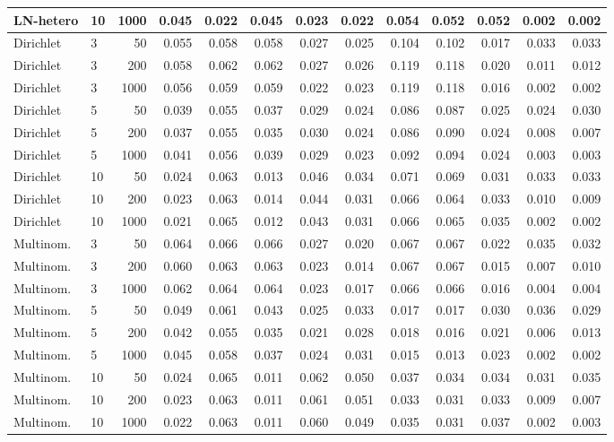 \begin{tabular}{llrrrrrrrrrrr}
LN-hetero & 10 & 1000 & 0.045 & 0.022 & 0.045 & 0.023 & 0.022 & 0.054 & 0.052 & 0.052 & 0.002 & 0.002 \\
\midrule
Dirichlet & 3 & 50 & 0.055 & 0.058 & 0.058 & 0.027 & 0.025 & 0.104 & 0.102 & 0.017 & 0.033 & 0.033 \\
Dirichlet & 3 & 200 & 0.058 & 0.062 & 0.062 & 0.027 & 0.026 & 0.119 & 0.118 & 0.020 & 0.011 & 0.012 \\
Dirichlet & 3 & 1000 & 0.056 & 0.059 & 0.059 & 0.022 & 0.023 & 0.119 & 0.118 & 0.016 & 0.002 & 0.002 \\
Dirichlet & 5 & 50 & 0.039 & 0.055 & 0.037 & 0.029 & 0.024 & 0.086 & 0.087 & 0.025 & 0.024 & 0.030 \\
Dirichlet & 5 & 200 & 0.037 & 0.055 & 0.035 & 0.030 & 0.024 & 0.086 & 0.090 & 0.024 & 0.008 & 0.007 \\
Dirichlet & 5 & 1000 & 0.041 & 0.056 & 0.039 & 0.029 & 0.023 & 0.092 & 0.094 & 0.024 & 0.003 & 0.003 \\
Dirichlet & 10 & 50 & 0.024 & 0.063 & 0.013 & 0.046 & 0.034 & 0.071 & 0.069 & 0.031 & 0.033 & 0.033 \\
Dirichlet & 10 & 200 & 0.023 & 0.063 & 0.014 & 0.044 & 0.031 & 0.066 & 0.064 & 0.033 & 0.010 & 0.009 \\
Dirichlet & 10 & 1000 & 0.021 & 0.065 & 0.012 & 0.043 & 0.031 & 0.066 & 0.065 & 0.035 & 0.002 & 0.002 \\
\midrule
Multinom. & 3 & 50 & 0.064 & 0.066 & 0.066 & 0.027 & 0.020 & 0.067 & 0.067 & 0.022 & 0.035 & 0.032 \\
Multinom. & 3 & 200 & 0.060 & 0.063 & 0.063 & 0.023 & 0.014 & 0.067 & 0.067 & 0.015 & 0.007 & 0.010 \\
Multinom. & 3 & 1000 & 0.062 & 0.064 & 0.064 & 0.023 & 0.017 & 0.066 & 0.066 & 0.016 & 0.004 & 0.004 \\
Multinom. & 5 & 50 & 0.049 & 0.061 & 0.043 & 0.025 & 0.033 & 0.017 & 0.017 & 0.030 & 0.036 & 0.029 \\
Multinom. & 5 & 200 & 0.042 & 0.055 & 0.035 & 0.021 & 0.028 & 0.018 & 0.016 & 0.021 & 0.006 & 0.013 \\
Multinom. & 5 & 1000 & 0.045 & 0.058 & 0.037 & 0.024 & 0.031 & 0.015 & 0.013 & 0.023 & 0.002 & 0.002 \\
Multinom. & 10 & 50 & 0.024 & 0.065 & 0.011 & 0.062 & 0.050 & 0.037 & 0.034 & 0.034 & 0.031 & 0.035 \\
Multinom. & 10 & 200 & 0.023 & 0.063 & 0.011 & 0.061 & 0.051 & 0.033 & 0.031 & 0.033 & 0.009 & 0.007 \\
Multinom. & 10 & 1000 & 0.022 & 0.063 & 0.011 & 0.060 & 0.049 & 0.035 & 0.031 & 0.037 & 0.002 & 0.003 \\
\bottomrule
\end{tabular}